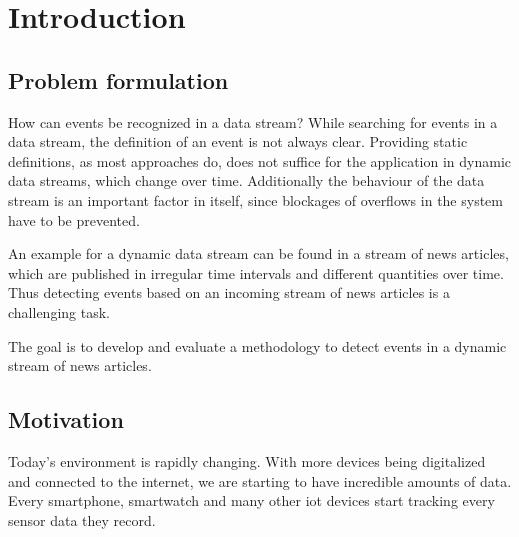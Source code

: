 \section{Introduction}

\subsection{Problem formulation}




How can events be recognized in a data stream?
While searching for events in a data stream, the definition of an event is not always clear.
Providing static definitions, as most approaches do,
does not suffice for the application in dynamic data streams, which change over time.
Additionally the behaviour of the data stream is an important factor in itself,
since blockages of overflows in the system have to be prevented.

An example for a dynamic data stream can be found in a stream of news articles, which are published in irregular time intervals and different quantities over time. Thus detecting events based on an incoming stream of news articles is a challenging task. 

The goal is to develop and evaluate a methodology to detect events in a dynamic stream of news articles.

\subsection{Motivation}
Today's environment is rapidly changing.
With more devices being digitalized and connected to the internet,
we are starting to have incredible amounts of data.
Every smartphone, smartwatch and many other \gls{iot} devices start tracking every sensor data they record.

